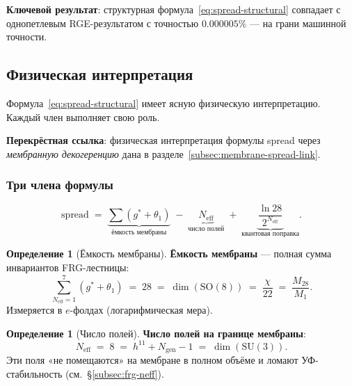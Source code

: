 \documentclass[11pt,a4paper]{article}
\newcommand{\SU}{\ensuremath{\mathrm{SU}}}
\newcommand{\SO}{\ensuremath{\mathrm{SO}}}
\theoremstyle{definition}
\newtheorem{definition}[theorem]{Определение}
\begin{document}
\medskip\noindent
\textbf{Ключевой результат}: структурная формула~\eqref{eq:spread-structural}
совпадает с однопетлевым RGE-результатом с точностью
$\mathbf{0.000005\%}$ --- на грани машинной точности.

\subsection{Физическая интерпретация}
\label{subsec:spread-meaning}

Формула~\eqref{eq:spread-structural} имеет ясную физическую
интерпретацию. Каждый член выполняет свою роль.

\medskip\noindent
\textbf{Перекрёстная ссылка}: физическая интерпретация
формулы spread через \emph{мембранную декогеренцию}
дана в разделе~\ref{subsec:membrane-spread-link}.

\subsubsection{Три члена формулы}

\begin{equation}
    \text{spread} \;=\;
    \underbrace{\sum (g^* + \theta_1)}_{\text{ёмкость мембраны}}
    \;-\; \underbrace{N_{\text{eff}}}_{\text{число полей}}
    \;+\; \underbrace{\frac{\ln 28}{2^{N_{\text{eff}}}}}_{\text{квантовая поправка}}.
    \label{eq:spread-three-terms}
\end{equation}

\begin{definition}[Ёмкость мембраны]
\label{def:capacity}
\textbf{Ёмкость мембраны} --- полная сумма инвариантов FRG-лестницы:
\begin{equation}
    \boxed{
    \sum_{N_{\text{eff}}=1}^{7} (g^* + \theta_1) \;=\; 28
    \;=\; \dim(\SO(8)) \;=\; \frac{\chi}{22} \;=\; \frac{M_{28}}{M_1}.
    }
    \label{eq:capacity-value}
\end{equation}
Измеряется в $e$-фолдах (логарифмическая мера).
\end{definition}

\begin{definition}[Число полей]
\label{def:n-fields}
\textbf{Число полей на границе мембраны}:
\begin{equation}
    \boxed{
    N_{\text{eff}} \;=\; 8
    \;=\; h^{11} + N_{\text{gen}} - 1
    \;=\; \dim(\SU(3)).
    }
    \label{eq:n-fields-value}
\end{equation}
Эти поля «не помещаются» на мембране в полном объёме и
ломают УФ-стабильность (см.~\S\ref{subsec:frg-neff}).
\end{definition}
\end{document}
